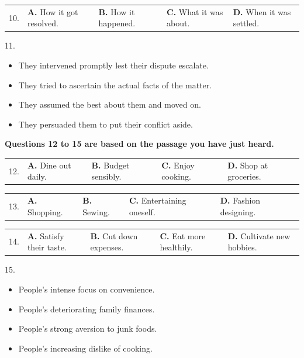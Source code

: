 \documentclass[UTF8,11pt]{ctexart}
\begin{document}
\noindent\begin{tabularx}{\linewidth}{@{}lXXXX@{}}10. & \textbf{A.} How it got resolved. & \textbf{B.} How it happened. & \textbf{C.} What it was about. & \textbf{D.} When it was settled.\\\end{tabularx}\par

11.


\begin{itemize}[leftmargin=2em,itemsep=.2em,topsep=.4em]\item[A.] They intervened promptly lest their dispute escalate.
\item[B.] They tried to ascertain the actual facts of the matter.
\item[C.] They assumed the best about them and moved on.
\item[D.] They persuaded them to put their conflict aside.
\end{itemize}

\textbf{Questions 12 to 15 are based on the passage you have just heard.}


\noindent\begin{tabularx}{\linewidth}{@{}lXXXX@{}}12. & \textbf{A.} Dine out daily. & \textbf{B.} Budget sensibly. & \textbf{C.} Enjoy cooking. & \textbf{D.} Shop at groceries.\\\end{tabularx}\par

\noindent\begin{tabularx}{\linewidth}{@{}lXXXX@{}}13. & \textbf{A.} Shopping. & \textbf{B.} Sewing. & \textbf{C.} Entertaining oneself. & \textbf{D.} Fashion designing.\\\end{tabularx}\par

\noindent\begin{tabularx}{\linewidth}{@{}lXXXX@{}}14. & \textbf{A.} Satisfy their taste. & \textbf{B.} Cut down expenses. & \textbf{C.} Eat more healthily. & \textbf{D.} Cultivate new hobbies.\\\end{tabularx}\par

15.


\begin{itemize}[leftmargin=2em,itemsep=.2em,topsep=.4em]\item[A.] People’s intense focus on convenience.
\item[B.] People’s deteriorating family finances.
\item[C.] People’s strong aversion to junk foods.
\item[D.] People’s increasing dislike of cooking.
\end{itemize}
\end{document}
